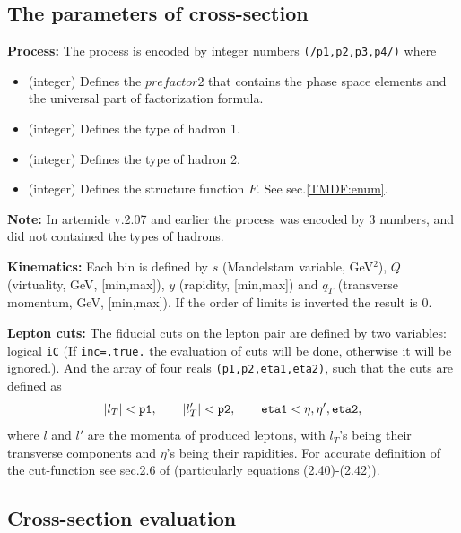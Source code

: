 \documentclass[prd,nofootinbib,eqsecnum,final]{revtex4}
\renewcommand{\(}{\left(}
\renewcommand{\)}{\right)}
\renewcommand{\[}{\left[}
\renewcommand{\]}{\right]}
\newcommand{\red}[1]{{\color[rgb]{1,0,0} #1}}
\begin{document}
\subsection{The parameters of cross-section}
\label{TMDX:setup}


\textbf{Process:} The process is encoded by integer numbers \texttt{(/p1,p2,p3,p4/)} where
\begin{itemize}
\item[\texttt{p1}] (integer) Defines the $prefactor2$ that contains the phase space elements and the universal part of factorization formula. 
\item[\texttt{p2}] (integer) Defines the type of hadron 1.
\item[\texttt{p3}] (integer) Defines the type of hadron 2.
\item[\texttt{p4}] (integer) Defines the structure function $F$. See sec.\ref{TMDF:enum}. 
\end{itemize}
\textbf{Note:} \red{In artemide v.2.07 and earlier} the process was encoded by 3 numbers, and did not contained the types of hadrons.

\textbf{Kinematics:} Each bin is defined by $s$ (Mandelstam variable, GeV$^2$), $Q$ (virtuality, GeV, [min,max]), $y$ (rapidity, [min,max]) and $q_T$ (transverse momentum, GeV, [min,max]). If the order of limits is inverted the result is 0.

\textbf{Lepton cuts:} The fiducial cuts on the lepton pair are defined by two variables: logical \texttt{iC} (If \texttt{inc=.true.} the evaluation of cuts will be done, otherwise it will be ignored.). And the array of four reals \texttt{(p1,p2,eta1,eta2)}, such that the cuts are defined as
\begin{eqnarray}
|l_T|<\text{\texttt{p1}},\qquad |l'_T|<\text{\texttt{p2}},\qquad \text{\texttt{eta1}}<\eta,\eta',\text{\texttt{eta2}},
\end{eqnarray}
where $l$ and $l'$ are the momenta of produced leptons, with $l_T$'s being their transverse components and $\eta$'s being their rapidities. For accurate definition of the cut-function see sec.2.6 of \cite{Scimemi:2017etj} (particularly equations (2.40)-(2.42)).

\subsection{Cross-section evaluation}
\label{TMDX:xsec}
\end{document}
